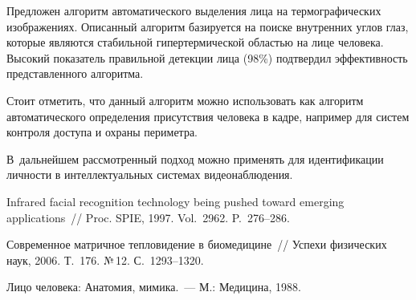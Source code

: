 \begin{multicols}{2}
  Предложен алгоритм автоматического выделения лица на термографических 
изображениях. Описанный алгоритм базируется на поиске внут\-рен\-них углов глаз, 
которые являются стабильной гипертермической областью на лице человека. 
Высокий показатель правильной детекции лица (98\%) подтвердил эффективность 
представленного алгоритма.
  
  Стоит отметить, что данный алгоритм можно использовать как алгоритм 
автоматического определения присутствия человека в кадре, например для 
систем контроля доступа и охраны периметра.
  
  В~дальнейшем рассмотренный подход можно применять для идентификации 
личности в интеллектуальных системах видеонаблюдения.

\vspace*{-6pt}

{\small\frenchspacing
{%
\begin{thebibliography}{9}

Infrared facial recognition technology being pushed toward emerging applications~// 
Proc. SPIE, 1997. Vol.~2962. P.~276--286.

Современное матричное тепловидение в биомедицине~// Успехи физических 
наук, 2006. Т.~176. №\,12. С.~1293--1320.

 \label{end\stat}

Лицо человека: Анатомия, мимика.~--- М.: Медицина, 1988.
 \end{thebibliography}
}
}


\end{multicols}  